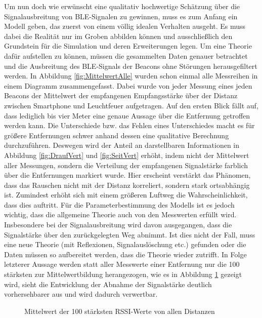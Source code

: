 Um nun doch wie erwünscht eine qualitativ hochwertige Schätzung über die Signalausbreitung von BLE-Signalen zu gewinnen, muss es zum Anfang ein Modell geben, das zuerst von einem völlig idealen Verhalten ausgeht. Es muss dabei die Realität nur im Groben abbilden können und ausschließlich den Grundstein für die Simulation und deren Erweiterungen legen. Um eine Theorie dafür aufstellen zu können, müssen die gesammelten Daten genauer betrachtet und die Ausbreitung des BLE-Signals der Beacons ohne Störungen herausgefiltert werden. In Abbildung \ref{fig:MittelwertAlle} wurden schon einmal alle Messreihen in einem Diagramm zusammengefasst. Dabei wurde von jeder Messung eines jeden Beacons der Mittelwert der empfangenen Empfangsstärke über der Distanz zwischen Smartphone und Leuchtfeuer aufgetragen. Auf den ersten Blick fällt auf, dass lediglich bis vier Meter eine genaue Aussage über die Entfernung getroffen werden kann. Die Unterschiede bzw. das Fehlen eines Unterschiedes macht es für größere Entfernungen schwer anhand dessen eine qualitative Berechnung durchzuführen. Deswegen wird der Anteil an darstellbaren Informationen in Abbildung \ref{fig:DraufVert} und \ref{fig:SeitVert} erhöht, indem nicht der Mittelwert aller Messungen, sondern die Verteilung der empfangenen Signalstärke farblich über die Entfernungen markiert wurde. Hier erscheint verstärkt das Phänomen, dass das Rauschen nicht mit der Distanz korreliert, sondern stark ortsabhängig ist. Zumindest erhöht sich mit einem größeren Luftweg die Wahrscheinlichkeit, dass dies auftritt. Für die Parameterbestimmung des Modells ist es jedoch wichtig, dass die allgemeine Theorie auch von den Messwerten erfüllt wird. Insbesondere bei der Signalausbreitung wird davon ausgegangen, dass die Signalstärke über den zurückgelegten Weg abnimmt. Ist dies nicht der Fall, muss eine neue Theorie (mit Reflexionen, Signalauslöschung etc.) gefunden oder die Daten müssen so aufbereitet werden, dass die Theorie wieder zutrifft. In Folge letzterer Aussage werden statt aller Messwerte einer Entfernung nur die 100 stärksten zur Mittelwertbildung herangezogen, wie es in Abbildung \ref{fig:Mittelwert100} gezeigt wird, sieht die Entwicklung der Abnahme der Signalstärke deutlich vorhersehbarer aus und wird dadurch verwertbar.
\begin{figure}[H] 
\centering
{}
\caption{Mittelwert der 100 stärksten RSSI-Werte von allen Distanzen}
\label{fig:Mittelwert100}
\end{figure}
